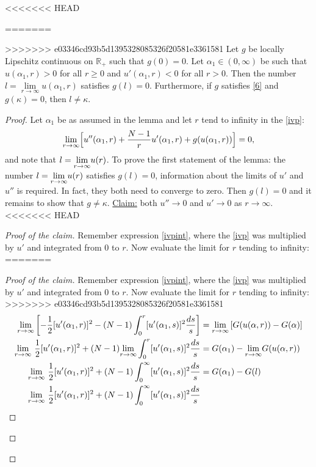 <<<<<<< HEAD
\begin{lemma}\label{llemma}
=======
\begin{lemma}\label{llemma} 
>>>>>>> e03346cd93b5d1395328085326f20581e3361581
Let $g$ be locally Lipschitz continuous on $\mathbb{R_+}$ such that $g(0)=0$. Let $\alpha_1\in(0,\infty)$ be such that $u(\alpha_1,r)>0$ for all $r\geq0$ and $u'(\alpha_1,r)<0$ for all $r>0$. Then the number $l=\underset{r\to\infty}{\lim}u(\alpha_1,r)$ satisfies $g(l)=0$. Furthermore, if $g$ satisfies \eqref{6} and $g(\kappa)=0$, then $l\neq\kappa$.
\end{lemma}
\begin{proof}
Let $\alpha_1$ be as assumed in the lemma and let $r$ tend to infinity in the \eqref{ivp}:
\begin{equation}\label{ivplim}\underset{r\to\infty}{\lim}\Big[u''(\alpha_1,r)+\frac{N-1}{r}u'(\alpha_1,r)+g(u(\alpha_1,r))\Big]=0,\end{equation} and note that $l=\underset{r\to\infty}{\lim} u(r)$. To prove the first statement of the lemma: the number $l=\underset{r\to\infty}{\lim} u(r)$ satisfies $g(l)=0$, information about the limits of $u'$ and $u''$ is required. In fact, they both need to converge to zero. Then $g(l)=0$ and it remains to show that $g\neq\kappa$. \underline{Claim:} both $u''\to0$ and $u'\to0$ as $r\to\infty.$
<<<<<<< HEAD
\begin{proof}[Proof of the claim] Remember expression \eqref{ivpint}, where the \eqref{ivp} was multiplied by $u'$ and integrated from 0 to $r$. Now evaluate the limit for $r$ tending to infinity:
=======
\begin{proof}[Proof of the claim] Remember expression \eqref{ivpint}, where the \eqref{ivp} was multiplied by $u'$ and integrated from 0 to $r$. Now evaluate the limit for $r$ tending to infinity: 
>>>>>>> e03346cd93b5d1395328085326f20581e3361581
\begin{align*}
	\underset{r\to\infty}{\lim}\left[-\frac{1}{2}[u'(\alpha_1,r)]^2-(N-1)\int_0^r[u'(\alpha_1,s)]^2\frac{ds}{s}\right]
        &=\limrtoinf\left[G(u(\alpha,r))-G(\alpha)\right] \\
    \underset{r\to\infty}{\lim}~\frac{1}{2}[u'(\alpha_1,r)]^2+(N-1)\underset{r\to\infty}{\lim}\int_0^r[u'(\alpha_1,s)]^2\frac{ds}{s}
        &=G(\alpha_1)-\underset{r\to\infty}{\lim}G(u(\alpha,r))\\
    \underset{r\to\infty}{\lim}~\frac{1}{2}[u'(\alpha_1,r)]^2+(N-1)\int_0^\infty[u'(\alpha_1,s)]^2\frac{ds}{s}
        &=G(\alpha_1)-G(l)\\
    \underset{r\to\infty}{\lim}~\frac{1}{2}[u'(\alpha_1,r)]^2+(N-1)\int_0^\infty[u'(\alpha_1,s)]^2\frac{ds}{s}

\end{align*}
\end{proof}
\end{proof}
\end{proof}
\end{lemma}
